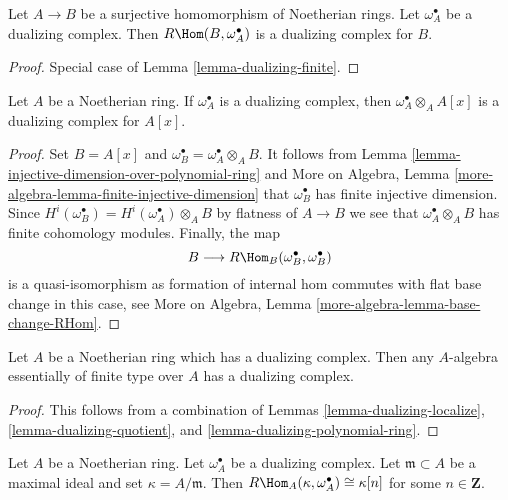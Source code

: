 \begin{lemma}
\label{lemma-dualizing-quotient}
Let $A \to B$ be a surjective homomorphism of Noetherian rings.
Let $\omega_A^\bullet$ be a dualizing complex.
Then $R\Hom(B, \omega_A^\bullet)$ is a dualizing complex for $B$.
\end{lemma}

\begin{proof}
Special case of Lemma \ref{lemma-dualizing-finite}.
\end{proof}

\begin{lemma}
\label{lemma-dualizing-polynomial-ring}
Let $A$ be a Noetherian ring. If $\omega_A^\bullet$ is a dualizing
complex, then $\omega_A^\bullet \otimes_A A[x]$ is a dualizing
complex for $A[x]$.
\end{lemma}

\begin{proof}
Set $B = A[x]$ and $\omega_B^\bullet = \omega_A^\bullet \otimes_A B$.
It follows from Lemma \ref{lemma-injective-dimension-over-polynomial-ring}
and More on Algebra, Lemma \ref{more-algebra-lemma-finite-injective-dimension}
that $\omega_B^\bullet$ has finite injective dimension.
Since $H^i(\omega_B^\bullet) = H^i(\omega_A^\bullet) \otimes_A B$
by flatness of $A \to B$ we see that $\omega_A^\bullet \otimes_A B$
has finite cohomology modules. Finally, the map
$$
B \longrightarrow R\Hom_B(\omega_B^\bullet, \omega_B^\bullet)
$$
is a quasi-isomorphism as formation of internal hom commutes with
flat base change in this case, see
More on Algebra, Lemma \ref{more-algebra-lemma-base-change-RHom}.
\end{proof}

\begin{proposition}
\label{proposition-dualizing-essentially-finite-type}
Let $A$ be a Noetherian ring which has a dualizing complex.
Then any $A$-algebra essentially of finite type over $A$
has a dualizing complex.
\end{proposition}

\begin{proof}
This follows from a combination of
Lemmas \ref{lemma-dualizing-localize},
\ref{lemma-dualizing-quotient}, and \ref{lemma-dualizing-polynomial-ring}.
\end{proof}

\begin{lemma}
\label{lemma-find-function}
Let $A$ be a Noetherian ring. Let $\omega_A^\bullet$ be a dualizing
complex. Let $\mathfrak m \subset A$ be a maximal ideal and set
$\kappa = A/\mathfrak m$. Then
$R\Hom_A(\kappa, \omega_A^\bullet) \cong \kappa[n]$ for some
$n \in \mathbf{Z}$.
\end{lemma}

